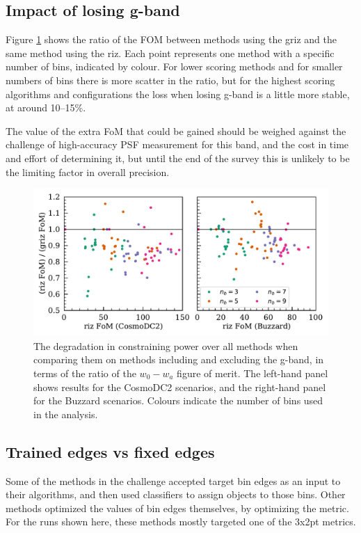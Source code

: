 \documentclass[twocolumn,twocolappendix]{aastex63}
\begin{document}
\subsection{Impact of losing g-band} \label{sec:gband}
Figure \ref{fig:loss} shows the ratio of the FOM between methods using the griz and the same method
using the riz.  Each point represents one method with a specific number of bins, indicated by colour.
For lower scoring methods and for smaller numbers of bins there is more scatter in the ratio,
but for the highest scoring algorithms and configurations the loss when losing g-band is a little
more stable, at around 10--15\%.

The value of the extra FoM that could be gained should be weighed against 
the challenge of high-accuracy
PSF measurement for this band, and the cost in time and effort of determining it, 
but until the end of the survey this is unlikely to be the limiting factor in overall precision.


\begin{figure}
\includegraphics[width=0.9\linewidth]{results/g_band_loss.pdf}
\caption{The degradation in constraining power over all methods
 when comparing them on methods including and excluding
the g-band, in terms of the ratio of the $w_0-w_a$ figure of merit.  The left-hand panel shows
results for the CosmoDC2 scenarios, and the right-hand panel for the Buzzard scenarios.  Colours
indicate the number of bins used in the analysis.}
\label{fig:loss}
\end{figure}

\subsection{Trained edges vs fixed edges}\label{sec:train-vs-fix}

Some of the methods in the challenge accepted target bin edges as an input to their algorithms,
and then used classifiers to assign objects to those bins.  Other methods optimized the values
of bin edges themselves, by optimizing the metric.  For the runs shown here, these methods mostly
targeted one of the 3x2pt metrics.
\end{document}
